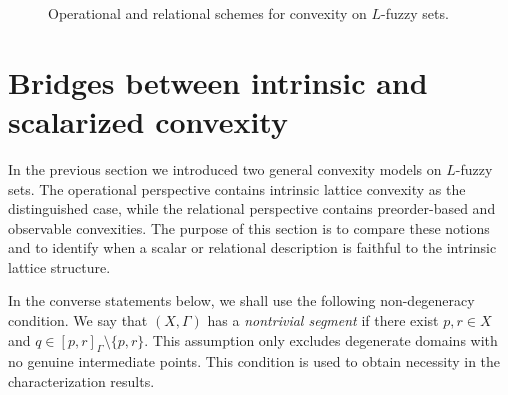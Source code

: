 \documentclass[11pt,a4paper]{article}
\begin{document}
\begin{figure}[htbp]
\caption{Operational and relational schemes for convexity on \(L\)-fuzzy sets.}
\label{fig_convexity1}
\end{figure}



\section{Bridges between intrinsic and scalarized convexity}\label{section:bridges}

In the previous section we introduced two general convexity models on \(L\)-fuzzy sets. The operational perspective contains intrinsic lattice convexity as the distinguished case, while the relational perspective contains preorder-based and observable convexities. The purpose of this section is to compare these notions and to identify when a scalar or relational description is faithful to the intrinsic lattice structure.

\smallskip

In the converse statements below, we shall use the following non-degeneracy condition. We say that \((X,\Gamma)\) has a \emph{nontrivial segment} if there exist \(p,r\in X\) and \(q\in[p,r]_{\Gamma}\setminus\{p,r\}\). This assumption only excludes degenerate domains with no genuine intermediate points. This condition is used to obtain necessity in the characterization results.
\end{document}
